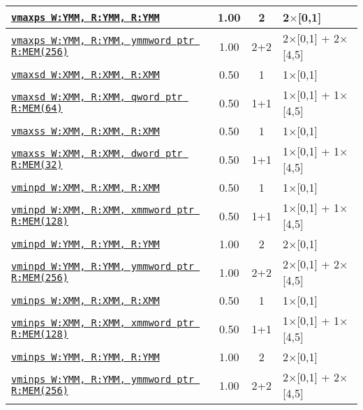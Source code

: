 \documentclass[a4paper,english,fontsize=9]{scrartcl}
\begin{document}
\begin{longtable}{p{}ccL{.25\textwidth}}
  \midrule
  \texttt{\href{https://felixcloutier.com/x86/MAXPS.html}{vmaxps W:YMM, R:YMM, R:YMM}} & 1.00 & 2 & 2\(\times\)[0,1] \\
  \midrule
  \texttt{\href{https://felixcloutier.com/x86/MAXPS.html}{vmaxps W:YMM, R:YMM, ymmword ptr R:MEM(256)}} & 1.00 & 2+2 & 2\(\times\)[0,1] + 2\(\times\)[4,5] \\
  \midrule
  \texttt{\href{https://felixcloutier.com/x86/MAXSD.html}{vmaxsd W:XMM, R:XMM, R:XMM}} & 0.50 & 1 & 1\(\times\)[0,1] \\
  \midrule
  \texttt{\href{https://felixcloutier.com/x86/MAXSD.html}{vmaxsd W:XMM, R:XMM, qword ptr R:MEM(64)}} & 0.50 & 1+1 & 1\(\times\)[0,1] + 1\(\times\)[4,5] \\
  \midrule
  \texttt{\href{https://felixcloutier.com/x86/MAXSS.html}{vmaxss W:XMM, R:XMM, R:XMM}} & 0.50 & 1 & 1\(\times\)[0,1] \\
  \midrule
  \texttt{\href{https://felixcloutier.com/x86/MAXSS.html}{vmaxss W:XMM, R:XMM, dword ptr R:MEM(32)}} & 0.50 & 1+1 & 1\(\times\)[0,1] + 1\(\times\)[4,5] \\
  \midrule
  \texttt{\href{https://felixcloutier.com/x86/MINPD.html}{vminpd W:XMM, R:XMM, R:XMM}} & 0.50 & 1 & 1\(\times\)[0,1] \\
  \midrule
  \texttt{\href{https://felixcloutier.com/x86/MINPD.html}{vminpd W:XMM, R:XMM, xmmword ptr R:MEM(128)}} & 0.50 & 1+1 & 1\(\times\)[0,1] + 1\(\times\)[4,5] \\
  \midrule
  \texttt{\href{https://felixcloutier.com/x86/MINPD.html}{vminpd W:YMM, R:YMM, R:YMM}} & 1.00 & 2 & 2\(\times\)[0,1] \\
  \midrule
  \texttt{\href{https://felixcloutier.com/x86/MINPD.html}{vminpd W:YMM, R:YMM, ymmword ptr R:MEM(256)}} & 1.00 & 2+2 & 2\(\times\)[0,1] + 2\(\times\)[4,5] \\
  \midrule
  \texttt{\href{https://felixcloutier.com/x86/MINPS.html}{vminps W:XMM, R:XMM, R:XMM}} & 0.50 & 1 & 1\(\times\)[0,1] \\
  \midrule
  \texttt{\href{https://felixcloutier.com/x86/MINPS.html}{vminps W:XMM, R:XMM, xmmword ptr R:MEM(128)}} & 0.50 & 1+1 & 1\(\times\)[0,1] + 1\(\times\)[4,5] \\
  \midrule
  \texttt{\href{https://felixcloutier.com/x86/MINPS.html}{vminps W:YMM, R:YMM, R:YMM}} & 1.00 & 2 & 2\(\times\)[0,1] \\
  \midrule
  \texttt{\href{https://felixcloutier.com/x86/MINPS.html}{vminps W:YMM, R:YMM, ymmword ptr R:MEM(256)}} & 1.00 & 2+2 & 2\(\times\)[0,1] + 2\(\times\)[4,5] \\

\end{longtable}
\end{document}
